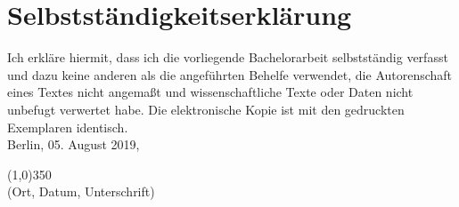 \section*{Selbstständigkeitserklärung}\label{sec:selbststandigkeitserklarung}
Ich erkläre hiermit, dass ich die vorliegende Bachelorarbeit selbstständig verfasst und dazu  keine  anderen  als  die  angeführten  Behelfe  verwendet,  die  Autorenschaft  eines Textes  nicht  angemaßt  und  wissenschaftliche  Texte  oder  Daten  nicht  unbefugt verwertet habe. Die elektronische Kopie ist mit den gedruckten Exemplaren identisch.
\vspace{5cm}
\\

Berlin, 05. August 2019, 
\begin{flushleft}
	\line(1,0){350}\\
	(Ort, Datum, Unterschrift)
\end{flushleft}